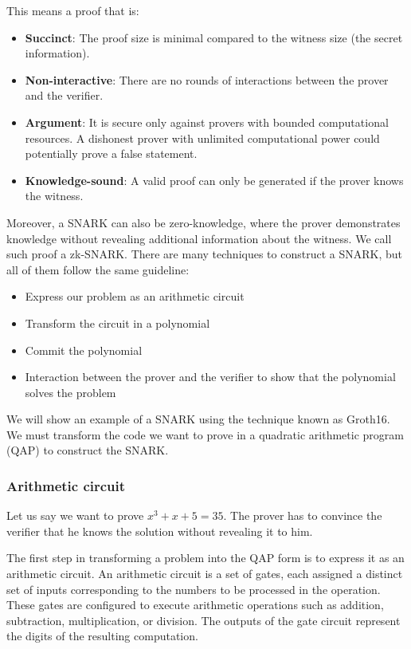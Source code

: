 This means a proof that is:
\begin{itemize}
\item \textbf{Succinct}: The proof size is minimal compared to the witness size (the secret information).
\item \textbf{Non-interactive}: There are no rounds of interactions between the prover and the verifier.
\item \textbf{Argument}: It is secure only against provers with bounded computational resources. A dishonest prover with unlimited computational power could potentially prove a false statement.
\item \textbf{Knowledge-sound}: A valid proof can only be generated if the prover knows the witness. \cite{NZ20}
\end{itemize}

Moreover, a SNARK can also be zero-knowledge, where the prover demonstrates knowledge without revealing additional information about the witness. We call such proof a zk-SNARK.
There are many techniques to construct a SNARK, but all of them follow the same guideline:
\begin{itemize}
   \item Express our problem as an arithmetic circuit
   \item Transform the circuit in a polynomial
   \item Commit the polynomial
   \item Interaction between the prover and the verifier to show that the polynomial solves the problem
 \end{itemize}
 We will show an example of a SNARK using the technique known as Groth16\cite{GR16}.
We must transform the code we want to prove in a quadratic arithmetic program (QAP) to construct the SNARK.


\subsubsection{Arithmetic circuit}
\label{subsec:ac}

Let us say we want to prove $x^3+x+5=35$.
The prover has to convince the verifier that he knows the solution without revealing it to him.

The first step in transforming a problem into the QAP form is to express it as an arithmetic circuit.
An arithmetic circuit is a set of gates, each assigned a distinct set of inputs corresponding to the numbers to be processed in the operation.
These gates are configured to execute arithmetic operations such as addition, subtraction, multiplication, or division. The outputs of the gate circuit represent the digits of the resulting computation.

